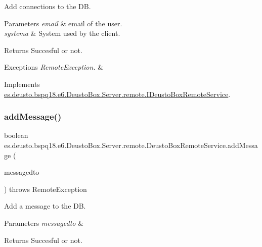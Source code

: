 Add connections to the DB. 
\begin{DoxyParams}{Parameters}
{\em email} & email of the user. \\
\hline
{\em systema} & System used by the client. \\
\hline
\end{DoxyParams}
\begin{DoxyReturn}{Returns}
Succesful or not. 
\end{DoxyReturn}

\begin{DoxyExceptions}{Exceptions}
{\em Remote\+Exception.} & \\
\hline
\end{DoxyExceptions}


Implements \mbox{\hyperlink{interfacees_1_1deusto_1_1bspq18_1_1e6_1_1_deusto_box_1_1_server_1_1remote_1_1_i_deusto_box_remote_service_a77a145d7830ce7342da34df1efc71189}{es.\+deusto.\+bspq18.\+e6.\+Deusto\+Box.\+Server.\+remote.\+I\+Deusto\+Box\+Remote\+Service}}.

\mbox{\label{classes_1_1deusto_1_1bspq18_1_1e6_1_1_deusto_box_1_1_server_1_1remote_1_1_deusto_box_remote_service_a107c5402a09f6de5482dd66967751439}} 
\subsubsection{\texorpdfstring{add\+Message()}{addMessage()}}
{\footnotesize\ttfamily boolean es.\+deusto.\+bspq18.\+e6.\+Deusto\+Box.\+Server.\+remote.\+Deusto\+Box\+Remote\+Service.\+add\+Message (\begin{DoxyParamCaption}\item[{\mbox{\hyperlink{classes_1_1deusto_1_1bspq18_1_1e6_1_1_deusto_box_1_1_server_1_1dto_1_1_d_message_d_t_o}{D\+Message\+D\+TO}}}]{messagedto }\end{DoxyParamCaption}) throws Remote\+Exception}

Add a message to the DB. 
\begin{DoxyParams}{Parameters}
{\em messagedto} & \\
\hline
\end{DoxyParams}
\begin{DoxyReturn}{Returns}
Succesful or not. 
\end{DoxyReturn}

